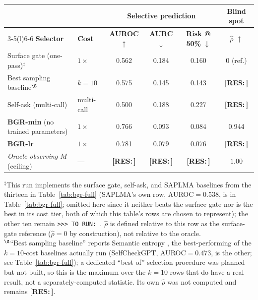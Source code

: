 \documentclass{article}
\newcommand{\RES}[1]{{\color{red}\textbf{[RES:\,#1]}}}
\newcommand{\TORUN}[1]{{\color{blue}\texttt{>{}>{}> TO RUN: #1}}}
\begin{document}
\begin{center}
\small
{}
\label{tab:bgr}
\vspace{1pt}
\begin{tabular}{@{}llcccc@{}}
\toprule
& & \multicolumn{3}{c}{\textbf{Selective prediction}} & \textbf{Blind spot}\\
\cmidrule(lr){3-5}\cmidrule(l){6-6}
\textbf{Selector} & \textbf{Cost} & \textbf{AUROC} $\uparrow$ & \textbf{AURC} $\downarrow$ &
\textbf{Risk @ 50\%} $\downarrow$ & $\hat\rho$ $\uparrow$\\
\midrule
Surface gate (one-pass)$^{\ddagger}$ & $1\times$   & 0.562 & 0.184 & 0.160 & 0 (ref.)\\
Best sampling baseline$^{\S}$  & $k{=}10$    & 0.575 & 0.145 & 0.143 & \RES{}\\
Self-ask (multi-call)         & multi-call  & 0.500 & 0.188 & 0.227 & \RES{}\\
\midrule
\textbf{BGR-min} (no trained parameters) & $1\times$ & 0.766 & 0.093 & 0.084 & 0.944\\
\textbf{BGR-lr}                          & $1\times$ & 0.781 & 0.079 & 0.076 & \RES{}\\
\midrule
\textit{Oracle observing $M$} \textnormal{(ceiling)} & --- & \RES{} & \RES{} & \RES{} & $1.00$\\
\bottomrule
\end{tabular}

\vspace{2pt}
{\footnotesize $^{\ddagger}$This run implements the surface gate, self-ask, and SAPLMA baselines
from the thirteen in Table~\ref{tab:bgr-full} (SAPLMA's own row, AUROC$=0.538$, is in
Table~\ref{tab:bgr-full}; omitted here since it neither beats the surface gate nor is the best
in its cost tier, both of which this table's rows are chosen to represent); the other ten remain
\TORUN{}. $\hat\rho$
is defined relative to this row as the surface-gate reference ($\hat\rho=0$ by construction), not
relative to the oracle.\\
$^{\S}$``Best sampling baseline'' reports Semantic entropy \citep{farquhar2024semantic}, the best-performing
of the $k{=}10$-cost baselines actually run (SelfCheckGPT, AUROC$=0.473$, is the other; see
Table~\ref{tab:bgr-full}); a dedicated ``best of'' selection procedure was planned but not built, so this
is the maximum over the $k{=}10$ rows that do have a real result, not a separately-computed statistic. Its
own $\hat\rho$ was not computed and remains \RES{}.}
\vspace{-0.5em}
\end{center}
\end{document}
